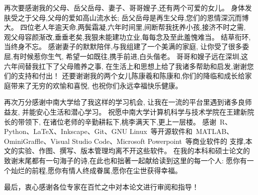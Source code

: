 再次要感谢我的父母、岳父岳母、妻子、哥哥嫂子,还有两个可爱的女儿。
身体发肤受之于父母,父母的爱如高山流水长;
岳父岳母是再生父母,您们的恩情深沉而博大。
四位老人年逾天命,两鬓霜凝,六年时间里,间断帮我抚养小孩,接济不时之需,
观父母容颜渐改,垂垂老矣,我狠未能建功立业,每每念及至此羞愧难当。
结草衔环,当终身不忘。
感谢妻子的默默陪伴,与我组建了一个美满的家庭,
让你受了很多委屈,有时候惹你生气,
希望一如既往,携手前进,白头偕老。
哥哥和嫂子远在深圳,这六年间替我扛下了父母赡养之事,
在生活上和思想上给了我诸多帮助和启发,谢谢您们的支持和付出！
还要谢谢我的两个女儿陈康羲和陈康和,你们的降临和成长给家庭带来了无穷的欢愉和喜悦,
也祝你们永远幸福快乐健康。

再次万分感谢中南大学给了我这样的学习机会, 
让我在一流的平台里遇到诸多良师益友,
并能安心生活和潜心学习。
祝愿中南大学计算机科学与技术学院在王建新院长的带领下, 
在诸位老师的辛勤耕耘下,桃李满天下,更上一层楼。
感谢~R、Python、\LaTeX、Inkscape、Git、GNU Linux~等开源软件和~MATLAB、OminiGraffle、Visual Studio Code、Microsoft Powerpoint~等商业软件的
支撑,本文的实验、作图、撰写、版本管理均离不开这些软件。
在我的本科和硕士论文的致谢末尾都有一句海子的诗,在此也和拙著一起献给读到这里的每一个人:
愿你有一个灿烂的前程,愿你有情人终成眷属,愿你在尘世获得幸福。

最后，衷心感谢各位专家在百忙之中对本论文进行审阅和指导！